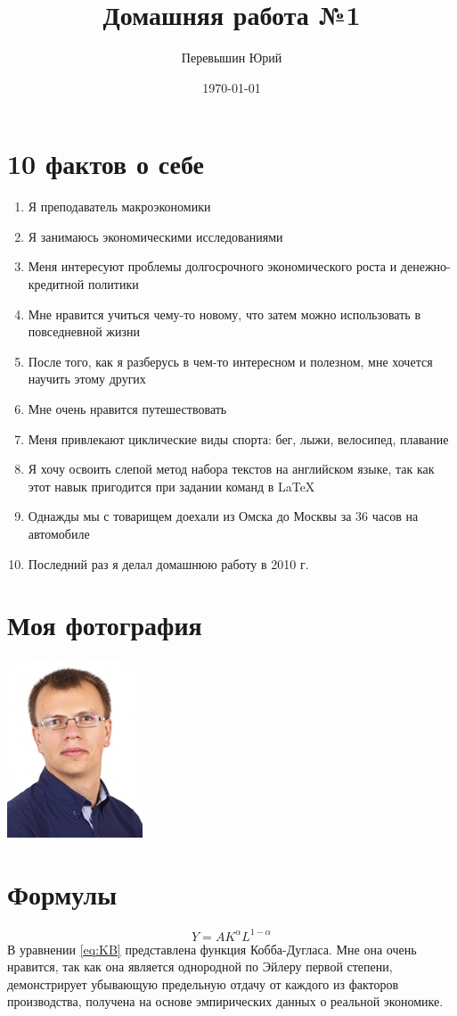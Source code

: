 \documentclass[12pt, a4paper]{article}
\author{Перевышин Юрий}
\title{Домашняя работа №1}
\date{\today}
\begin{document}
\maketitle


\section{10 фактов о себе}
\begin{enumerate}
\item Я преподаватель макроэкономики
\item Я занимаюсь экономическими исследованиями
\item Меня интересуют проблемы долгосрочного экономического роста и денежно-кредитной политики
\item Мне нравится учиться чему-то новому, что затем можно использовать в повседневной жизни
\item После того, как я разберусь в чем-то интересном и полезном, мне хочется научить этому других
\item Мне очень нравится путешествовать
\item Меня привлекают циклические виды спорта: бег, лыжи, велосипед, плавание
\item Я хочу освоить слепой метод набора текстов на английском языке, так как этот навык пригодится при задании команд в \LaTeX
\item Однажды мы с товарищем доехали из Омска до Москвы за 36 часов на автомобиле
\item Последний раз я делал домашнюю работу в 2010 г.
\end{enumerate}

\section{Моя фотография}
\includegraphics{perevyshin.jpg}

\section{Формулы}
\begin{equation} \label{eq:KB}
Y=AK^\alpha L^{1-\alpha} \tag{æ}
\end{equation}
В уравнении \ref{eq:KB} представлена функция Кобба-Дугласа. Мне она очень нравится, так как она является однородной по Эйлеру первой степени, демонстрирует убывающую предельную отдачу от каждого из факторов производства, получена на основе эмпирических данных о реальной экономике.
\end{document}
